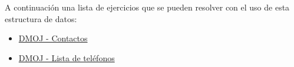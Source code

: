A continuación una lista de ejercicios que se pueden resolver con el uso de esta estructura de datos:

\begin{itemize}
	\item \href{https://dmoj.uclv.edu.cu/problem/contact}{DMOJ - Contactos}
	\item \href{https://dmoj.uclv.edu.cu/problem/phone}{DMOJ - Lista de teléfonos}
\end{itemize}